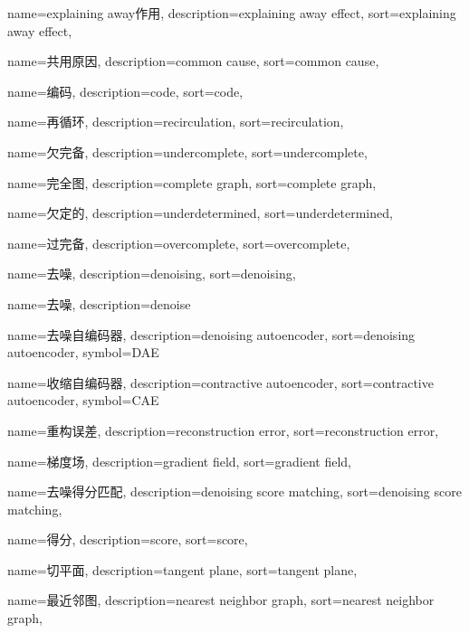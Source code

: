 {
  name=explaining away作用,
  description={explaining away effect},
  sort={explaining away effect},
}

{
  name=共用原因,
  description={common cause},
  sort={common cause},
}

{
  name=编码,
  description={code},
  sort={code},
}

{
  name=再循环,
  description={recirculation},
  sort={recirculation},
}

{
  name=欠完备,
  description={undercomplete},
  sort={undercomplete},
}


{
	name=完全图,
	description={complete graph},
	sort={complete graph},
}


{
	name=欠定的,
	description={underdetermined},
	sort={underdetermined},
}


{
  name=过完备,
  description={overcomplete},
  sort={overcomplete},
}

{
  name=去噪,
  description={denoising},
  sort={denoising},
}

{
  name=去噪,
  description={denoise}
}

{
  name=去噪自编码器,
  description={denoising autoencoder},
  sort={denoising autoencoder},
  symbol={DAE}
}

{
  name=收缩自编码器,
  description={contractive autoencoder},
  sort={contractive autoencoder},
  symbol={CAE}
}

{
  name=重构误差,
  description={reconstruction error},
  sort={reconstruction error},
}

{
  name=梯度场,
  description={gradient field},
  sort={gradient field},
}

{
  name=去噪得分匹配,
  description={denoising score matching},
  sort={denoising score matching},
}

{
  name=得分,
  description={score},
  sort={score},
}

{
  name=切平面,
  description={tangent plane},
  sort={tangent plane},
}

{
  name=最近邻图,
  description={nearest neighbor graph},
  sort={nearest neighbor graph},
}

